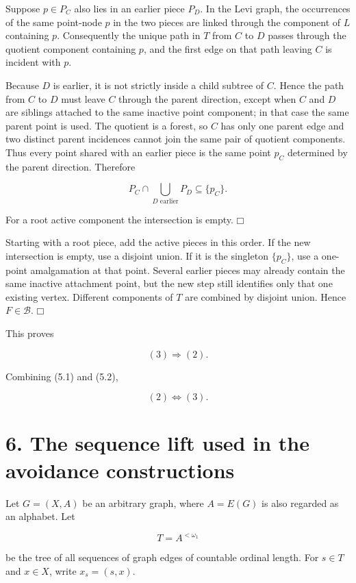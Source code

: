 \documentclass[11pt]{article}
\providecommand{\square}{\mdlgwhtsquare}
\begin{document}
Suppose \(p\in P_C\) also lies in an earlier piece \(P_D\). In the Levi graph, the occurrences of the same point-node \(p\) in the two pieces are linked through the component of \(L\) containing \(p\). Consequently the unique path in \(T\) from \(C\) to \(D\) passes through the quotient component containing \(p\), and the first edge on that path leaving \(C\) is incident with \(p\).

Because \(D\) is earlier, it is not strictly inside a child subtree of \(C\). Hence the path from \(C\) to \(D\) must leave \(C\) through the parent direction, except when \(C\) and \(D\) are siblings attached to the same inactive point component; in that case the same parent point is used. The quotient is a forest, so \(C\) has only one parent edge and two distinct parent incidences cannot join the same pair of quotient components. Thus every point shared with an earlier piece is the same point \(p_C\) determined by the parent direction. Therefore

\[
P_C\cap\bigcup_{D\text{ earlier}}P_D\subseteq\{p_C\}.
\]

For a root active component the intersection is empty. \(\square\)

Starting with a root piece, add the active pieces in this order. If the new intersection is empty, use a disjoint union. If it is the singleton \(\{p_C\}\), use a one-point amalgamation at that point. Several earlier pieces may already contain the same inactive attachment point, but the new step still identifies only that one existing vertex. Different components of \(T\) are combined by disjoint union. Hence \(F\in\mathcal B\). \(\square\)

This proves

\[
(3)\Longrightarrow(2). \tag{5.2}
\]

Combining (5.1) and (5.2),

\[
(2)\Longleftrightarrow(3). \tag{5.3}
\]

\section{6. The sequence lift used in the avoidance constructions}\label{the-sequence-lift-used-in-the-avoidance-constructions}

Let \(G=(X,A)\) be an arbitrary graph, where \(A=E(G)\) is also regarded as an alphabet. Let

\[
T=A^{<\omega_1}
\]

be the tree of all sequences of graph edges of countable ordinal length. For \(s\in T\) and \(x\in X\), write \(x_s=(s,x)\).
\end{document}
